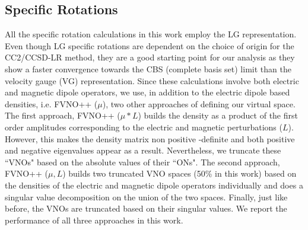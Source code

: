 \subsection{Specific Rotations}
All the specific rotation calculations in this work employ the LG representation.
Even though LG specific rotations are dependent on the choice of origin for the CC2/CCSD-LR method,
they are a good starting point for our analysis as they show a faster convergence towards the CBS 
(complete basis set) limit than the velocity gauge (VG) representation. Since these calculations 
involve both electric and magnetic dipole operators, we use, in addition to the electric dipole 
based densities, i.e. FVNO++ ($\mu$), two other approaches of defining our virtual space.
The first approach, FVNO++ ($\mu*L$) builds the density as a product of the first order amplitudes corresponding
to the electric and magnetic perturbations ($L$). However, this makes the density matrix non positive 
-definite and both positive and negative eigenvalues appear as a result. Nevertheless, we truncate 
these ``VNOs" based on the absolute values of their ``ONs". The second approach, FVNO++ ($\mu,L$) builds two truncated VNO 
spaces (50\% in this work) based on the densities of the electric and magnetic dipole operators individually and does a singular 
value decomposition on the union of the two spaces. Finally, just like before, the VNOs are truncated based on their singular values.
We report the performance of all three approaches in this work.
%
%
%
